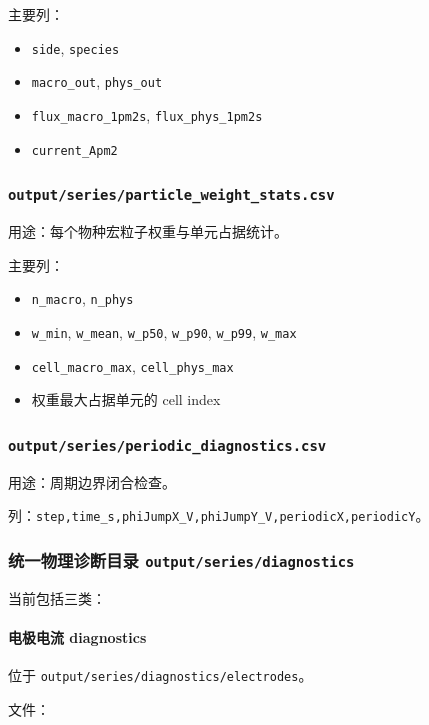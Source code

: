 \documentclass[11pt,a4paper]{ctexart}
\newcommand{\code}[1]{\texttt{#1}}
\newcommand{\file}[1]{\texttt{#1}}
\newcommand{\dir}[1]{\texttt{#1}}
\begin{document}
主要列：

\begin{itemize}
  \item \code{side}, \code{species}
  \item \code{macro\_out}, \code{phys\_out}
  \item \code{flux\_macro\_1pm2s}, \code{flux\_phys\_1pm2s}
  \item \code{current\_Apm2}
\end{itemize}

\subsubsection{\file{output/series/particle\_weight\_stats.csv}}

用途：每个物种宏粒子权重与单元占据统计。

主要列：

\begin{itemize}
  \item \code{n\_macro}, \code{n\_phys}
  \item \code{w\_min}, \code{w\_mean}, \code{w\_p50}, \code{w\_p90}, \code{w\_p99}, \code{w\_max}
  \item \code{cell\_macro\_max}, \code{cell\_phys\_max}
  \item 权重最大占据单元的 cell index
\end{itemize}

\subsubsection{\file{output/series/periodic\_diagnostics.csv}}

用途：周期边界闭合检查。

列：\code{step,time\_s,phiJumpX\_V,phiJumpY\_V,periodicX,periodicY}。

\subsubsection{统一物理诊断目录 \dir{output/series/diagnostics}}

当前包括三类：

\paragraph{电极电流 diagnostics}

位于 \dir{output/series/diagnostics/electrodes}。

文件：
\end{document}
